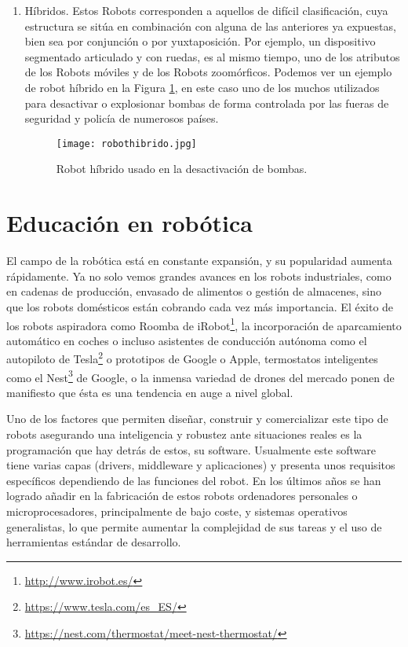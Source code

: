 \begin{enumerate}[1.]
	\item Híbridos.	Estos Robots corresponden a aquellos de difícil clasificación, cuya estructura se sitúa en combinación con alguna de las anteriores ya expuestas, bien sea por conjunción o por yuxtaposición. Por ejemplo, un dispositivo segmentado articulado y con ruedas, es al mismo tiempo, uno de los atributos de los Robots móviles y de los Robots zoomórficos. Podemos ver un ejemplo de robot híbrido en la Figura \ref{fig:hibrido}, en este caso uno de los muchos utilizados para desactivar o explosionar bombas de forma controlada por las fueras de seguridad y policía de numerosos países.
	\begin{figure}[h]
		\centering\texttt{[image: robothibrido.jpg]}
		\caption{Robot híbrido usado en la desactivación de bombas.}
		\label{fig:hibrido}
	\end{figure}
\end{enumerate}


\section{Educación en robótica}
\label{sec:intr_roboticaensenanza}

El campo de la robótica está en constante expansión, y su popularidad aumenta rápidamente. Ya no solo vemos grandes avances en los robots industriales, como en cadenas de producción, envasado de alimentos o gestión de almacenes, sino que los robots domésticos están cobrando cada vez más importancia. El éxito de los robots aspiradora como Roomba de iRobot\footnote{\url{http://www.irobot.es/}}, la incorporación de aparcamiento automático en coches o incluso asistentes de conducción autónoma como el autopiloto de Tesla\footnote{\url{https://www.tesla.com/es_ES/}} o prototipos de Google o Apple, termostatos inteligentes como el Nest\footnote{\url{https://nest.com/thermostat/meet-nest-thermostat/}} de Google, o la inmensa variedad de drones del mercado ponen de manifiesto que ésta es una tendencia en auge a nivel global.

Uno de los factores que permiten diseñar, construir y comercializar este tipo de robots asegurando una inteligencia y robustez ante situaciones reales es la programación que hay detrás de estos, su software. Usualmente este software tiene varias capas (drivers, middleware y aplicaciones) y presenta unos requisitos específicos dependiendo de las funciones del robot. En los últimos años se han logrado añadir en la fabricación de estos robots ordenadores personales o microprocesadores, principalmente de bajo coste, y sistemas operativos generalistas, lo que permite aumentar la complejidad de sus tareas y el uso de herramientas estándar de desarrollo.


